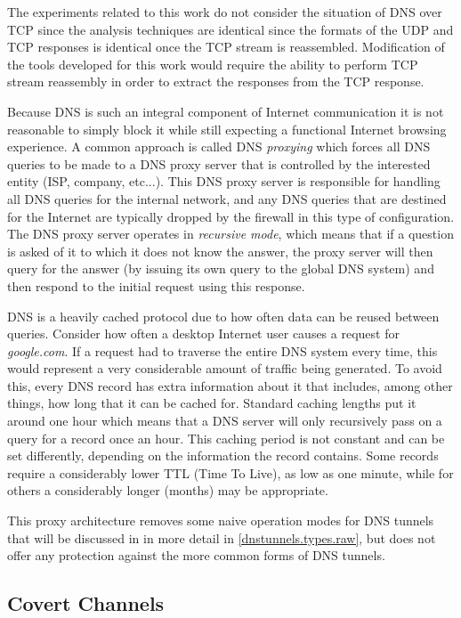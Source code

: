 \documentclass[12pt]{article}
\theoremstyle{remark}
\theoremstyle{definition}
\theoremstyle{definition}
\theoremstyle{definition}
\begin{document}
The experiments related to this work do not consider the situation of DNS over
TCP since the analysis techniques are identical since the formats of the UDP
and TCP responses is identical once the TCP stream is reassembled. Modification
of the tools developed for this work would require the ability to perform TCP
stream reassembly in order to extract the responses from the TCP response.

Because DNS is such an integral component of Internet communication it is not
reasonable to simply block it while still expecting a functional Internet
browsing experience. A common approach is called DNS \emph{proxying} which
forces all DNS queries to be made to a DNS proxy server that is controlled by
the interested entity (ISP, company, etc...). This DNS proxy server is
responsible for handling all DNS queries for the internal network, and any DNS
queries that are destined for the Internet are typically dropped by the
firewall in this type of configuration. The DNS proxy server operates in
\emph{recursive mode}, which means that if a question is asked of it to which
it does not know the answer, the proxy server will then query for the answer (by
issuing its own query to the global DNS system) and then respond to the initial
request using this response.

DNS is a heavily cached protocol due to how often data can be reused between queries. Consider how often a desktop Internet user causes a request for
\emph{google.com}. If a request had to traverse the entire DNS system every
time, this would represent a very considerable amount of traffic being
generated. To avoid this, every DNS record has extra information about it that
includes, among other things, how long that it can be cached for. Standard
caching lengths put it around one hour which means that a DNS server will only
recursively pass on a query for a record once an hour. This caching period is
not constant and can be set differently, depending on the information the
record contains. Some records require a considerably lower TTL (Time To Live),
as low as one minute, while for others a considerably longer (months) may be
appropriate.

This proxy architecture removes some naive operation modes for DNS tunnels
that will be discussed in in more detail in \ref{dnstunnels.types.raw}, but does
not offer any protection against the more common forms of DNS tunnels.

\subsection{Covert Channels}
\end{document}
